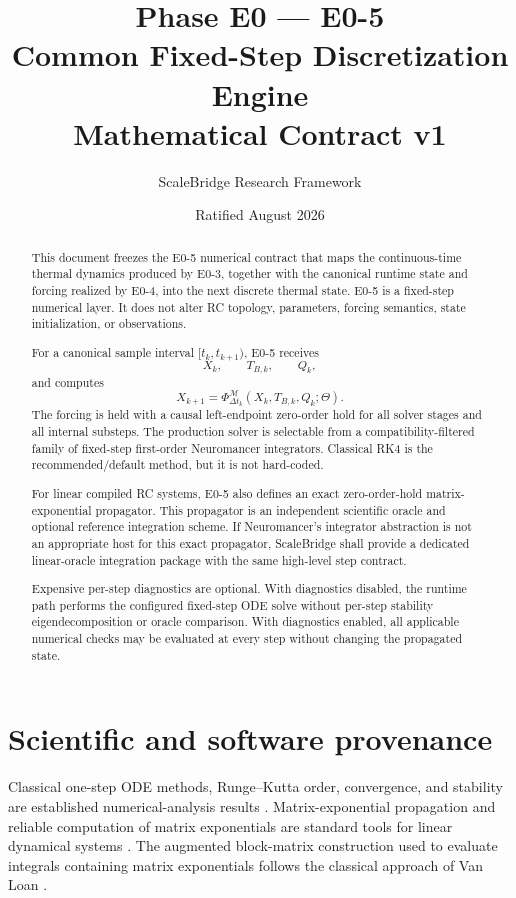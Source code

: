 \documentclass[11pt]{article}
\title{\SB{} Phase E0 --- E0-5\\
Common Fixed-Step Discretization Engine\\
Mathematical Contract v1}
\author{ScaleBridge Research Framework}
\date{Ratified August 2026}
\begin{document}
\maketitle

\begin{abstract}
This document freezes the E0-5 numerical contract that maps the continuous-time
thermal dynamics produced by E0-3, together with the canonical runtime state and
forcing realized by E0-4, into the next discrete thermal state. E0-5 is a
fixed-step numerical layer. It does not alter RC topology, parameters, forcing
semantics, state initialization, or observations.

For a canonical sample interval $[t_k,t_{k+1})$, E0-5 receives
\[
X_k,\qquad T_{B,k},\qquad Q_k,
\]
and computes
\[
\boxed{X_{k+1}=\Phi_{\Delta t_k}^{\mathcal M}(X_k,T_{B,k},Q_k;\Theta)}.
\]
The forcing is held with a causal left-endpoint zero-order hold for all solver
stages and all internal substeps. The production solver is selectable from a
compatibility-filtered family of fixed-step first-order Neuromancer integrators.
Classical RK4 is the recommended/default method, but it is not hard-coded.

For linear compiled RC systems, E0-5 also defines an exact zero-order-hold
matrix-exponential propagator. This propagator is an independent scientific
oracle and optional reference integration scheme. If Neuromancer's integrator
abstraction is not an appropriate host for this exact propagator, ScaleBridge
shall provide a dedicated linear-oracle integration package with the same
high-level step contract.

Expensive per-step diagnostics are optional. With diagnostics disabled, the
runtime path performs the configured fixed-step ODE solve without per-step
stability eigendecomposition or oracle comparison. With diagnostics enabled,
all applicable numerical checks may be evaluated at every step without changing
the propagated state.
\end{abstract}

\section{Scientific and software provenance}

Classical one-step ODE methods, Runge--Kutta order, convergence, and stability
are established numerical-analysis results \cite{Butcher2016ODE,HairerNorsettWanner1993ODEI}.
Matrix-exponential propagation and reliable computation of matrix exponentials
are standard tools for linear dynamical systems \cite{Higham2009MatrixExponential}.
The augmented block-matrix construction used to evaluate integrals containing
matrix exponentials follows the classical approach of Van Loan
\cite{VanLoan1978MatrixExponentialIntegrals}.
\end{document}
